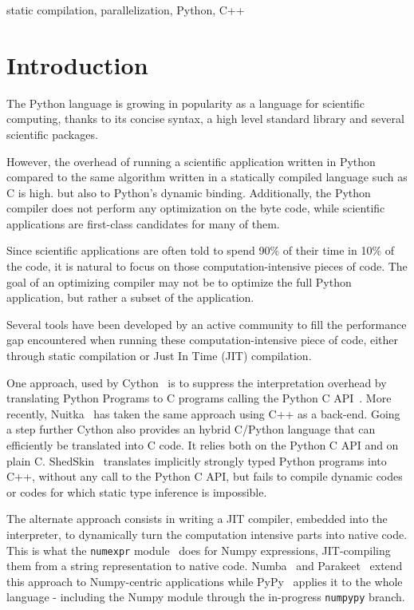 \documentclass[10pt, onecolumn, preprint]{sigplanconf}
\begin{document}
\keywords
static compilation, parallelization, Python, C++


\section{Introduction}

The Python language is growing in popularity as a language for scientific
computing, thanks to %
 its concise syntax, a high level standard library and
several scientific packages.

However, the overhead of running a scientific application written in Python
compared to the same algorithm written in a statically compiled language such
as C is high. %
but also to Python's dynamic binding. Additionally, the Python compiler does
not perform any optimization on the byte code, while scientific applications
are first-class candidates for many of them.

Since scientific applications are often told to spend 90\% of their time in
10\% of the code, it is natural to focus on those computation-intensive pieces 
of code. The goal of an optimizing compiler %
may not be to optimize the full Python application, but rather a subset of the application.

Several tools have been developed by an active community to fill the performance
gap encountered when running these computation-intensive piece of code, either
through static compilation or Just In Time (JIT) compilation.

One approach, used by Cython~\cite{cython2010} is to suppress the interpretation
overhead by translating Python Programs to C programs calling the Python C
API~\cite{pythoncapi}. More recently, Nuitka~\cite{nuitka}  has taken the same
approach using C++ as a back-end. Going a step further Cython also provides an
hybrid C/Python language that can efficiently be translated into C code. It 
relies both on the Python C API and on plain C.
ShedSkin~\cite{shedskin2006} translates implicitly strongly typed Python programs
into C++, without any call to the Python C API, but fails to compile dynamic
codes or codes for which static type inference is impossible.

The alternate approach consists in writing a JIT compiler, embedded into the
interpreter, to dynamically turn the computation intensive parts into native
code. This is what the \texttt{numexpr} module~\cite{numexpr} does for Numpy 
expressions, JIT-compiling them from a string representation to native code.
Numba~\cite{numba} and Parakeet~\cite{parakeet2012} extend this approach to
Numpy-centric applications while PyPy~\cite{pypy2009} applies it to the whole
language - including the Numpy module through the in-progress \texttt{numpypy}
branch.
\end{document}

